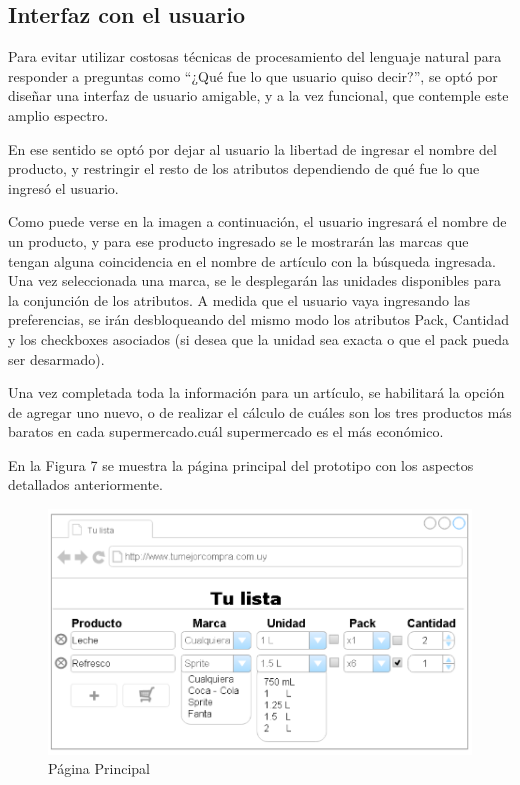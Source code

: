 \documentclass[12pt]{article} %
\begin{document}

\subsection{Interfaz con el usuario}
Para evitar utilizar costosas técnicas de procesamiento del lenguaje natural para responder a preguntas como “¿Qué fue lo que usuario quiso decir?”, se optó por diseñar una interfaz de usuario amigable, y a la vez funcional, que contemple este amplio espectro. 

En ese sentido se optó por dejar al usuario la libertad de ingresar el nombre del producto, y restringir el resto de los atributos dependiendo de qué fue lo que ingresó el usuario.

Como puede verse en la imagen a continuación, el usuario ingresará el nombre de un producto, y para ese producto ingresado se le mostrarán las marcas que tengan alguna coincidencia en el nombre de artículo con la búsqueda ingresada. Una vez seleccionada una marca, se le desplegarán las unidades disponibles para la conjunción de los atributos. A medida que el usuario vaya ingresando las preferencias, se irán desbloqueando del mismo modo los atributos Pack, Cantidad y los checkboxes asociados (si desea que la unidad sea exacta o que el pack pueda ser desarmado).

Una vez completada toda la información para un artículo, se habilitará la opción de agregar uno nuevo, o de realizar el cálculo de cuáles son los tres productos más baratos en cada supermercado.cuál supermercado es el más económico.

En la Figura 7 se muestra la página principal del prototipo con los aspectos detallados anteriormente.

\begin{figure}[H]
\includegraphics[height=0.30\textwidth]{interfaz_usuario}
\centering
\caption{Página Principal}
\end{figure}
\end{document}
